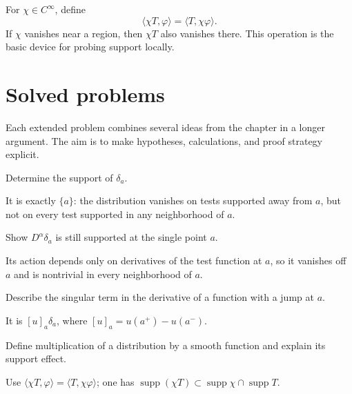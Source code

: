 \begin{example}\label{ex:iii17-worked-04}
For \(\chi\in C^\infty\), define
\[
\langle\chi T,\varphi\rangle=\langle T,\chi\varphi\rangle.
\]
If \(\chi\) vanishes near a region, then \(\chi T\) also vanishes there. This
operation is the basic device for probing support locally.
\end{example}

\section{Solved problems}
Each extended problem combines several ideas from the chapter in a longer argument. The aim is to make hypotheses, calculations, and proof strategy explicit.

\begin{problem}\label{prob:iii17-problem-01}
Determine the support of \(\delta_a\).
\end{problem}
\begin{solution}
It is exactly \(\{a\}\): the distribution vanishes on tests supported away
from \(a\), but not on every test supported in any neighborhood of \(a\).
\end{solution}

\begin{problem}\label{prob:iii17-problem-02}
Show \(D^\alpha\delta_a\) is still supported at the single point \(a\).
\end{problem}
\begin{solution}
Its action depends only on derivatives of the test function at \(a\), so it
vanishes off \(a\) and is nontrivial in every neighborhood of \(a\).
\end{solution}

\begin{problem}\label{prob:iii17-problem-03}
Describe the singular term in the derivative of a function with a jump at \(a\).
\end{problem}
\begin{solution}
It is \([u]_a\delta_a\), where \([u]_a=u(a^+)-u(a^-)\).
\end{solution}

\begin{problem}\label{prob:iii17-problem-04}
Define multiplication of a distribution by a smooth function and explain its support effect.
\end{problem}
\begin{solution}
Use \(\langle\chi T,\varphi\rangle=\langle T,\chi\varphi\rangle\); one has
\(\operatorname{supp}(\chi T)\subset
\operatorname{supp}\chi\cap\operatorname{supp}T\).
\end{solution}

